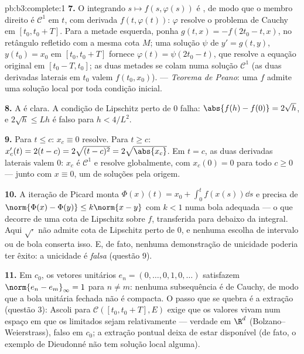 \begin{solution}{pb:b3:complete:1}
\textbf{7.} O integrando $s \mapsto f(s, \varphi(s))$ é
, de modo que o membro direito é $\mathcal C^1$ em $t$, com
derivada $f(t, \varphi(t))$: $\varphi$ resolve o problema de
Cauchy em $[t_0, t_0 + T]$. Para a metade esquerda, ponha $g(t, x) =
-f(2t_0 - t, x)$,  no retângulo refletido com
a mesma cota $M$; uma solução $\psi$ de $y' = g(t,y)$,
$y(t_0) = x_0$ em $[t_0, t_0 + T]$ fornece $\varphi(t) =
\psi(2t_0 - t)$, que resolve a equação original em $[t_0 - T,
t_0]$; as duas metades se colam numa solução $\mathcal C^1$ (as duas
derivadas laterais em $t_0$ valem $f(t_0, x_0)$). ---
\emph{Teorema de Peano}: uma $f$  admite uma solução
local por toda condição inicial.

\textbf{8.} A  é clara. A condição de Lipschitz perto de $0$ falha:
$\abs{f(h) - f(0)} = 2\sqrt h$, e $2\sqrt h \leq L h$ é
falso para $h < 4/L^2$.

\textbf{9.} Para $t \leq c$: $x_c \equiv 0$ resolve. Para $t \geq
c$: $x_c'(t) = 2(t - c) = 2\sqrt{(t-c)^2} = 2\sqrt{\abs{x_c}}$.
Em $t = c$, as duas derivadas laterais valem $0$: $x_c$ é
$\mathcal C^1$ e resolve globalmente, com $x_c(0) = 0$ para todo
$c \geq 0$ --- junto com $x \equiv 0$, um  de
soluções pela origem.

\textbf{10.} A iteração de Picard monta $\Phi(x)(t) = x_0 +
\int_0^t f(x(s))\dd s$ e precisa de $\norm{\Phi(x) - \Phi(y)}
\leq k\norm{x - y}$ com $k < 1$ numa bola adequada --- o que
decorre de uma cota de Lipschitz sobre $f$, transferida para debaixo
da integral. Aqui $\sqrt\cdot$ não admite cota de Lipschitz perto de $0$,
e nenhuma escolha de intervalo ou de bola conserta isso. E, de fato, nenhuma
demonstração de unicidade poderia ter êxito: a unicidade é \emph{falsa}
(questão 9).

\textbf{11.} Em $c_0$, os vetores unitários $e_n = (0, \dots, 0, 1,
0, \dots)$ satisfazem $\norm{e_n - e_m}_\infty = 1$ para $n \neq
m$: nenhuma subsequência é de Cauchy, de modo que a bola unitária fechada não é
compacta. O passo que se quebra é a extração (questão 3):
Ascoli para $\mathcal C([t_0, t_0+T], E)$ exige que os valores
vivam num espaço em que os limitados sejam relativamente  ---
verdade em $\R^d$ (Bolzano--Weierstrass), falso em $c_0$; a extração
pontual deixa de estar disponível (de fato, o exemplo de Dieudonné
não tem solução local alguma).


\end{solution}
